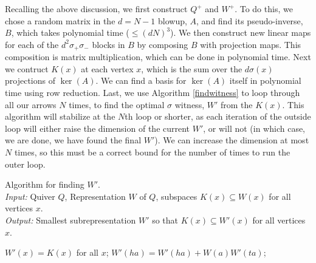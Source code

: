Recalling the above discussion, we first construct $Q^+$ and $W^+$. To do this, we chose a random matrix in the $d=N-1$ blowup, $A$, and find its pseudo-inverse, $B$, which takes polynomial time ($\leq(dN)^3$). We then construct new linear maps for each of the $d^2\sigma_+\sigma_-$ blocks in $B$ by composing $B$ with projection maps. This composition is matrix multiplication, which can be done in polynomial time. Next we contruct $K(x)$ at each vertex $x$, which is the sum over the $d\sigma(x)$ projections of $\ker(A)$. We can find a basis for $\ker(A)$ itself in polynomial time using row reduction. Last, we use Algorithm \ref{findwitness} to loop through all our arrows $N$ times, to find the optimal $\sigma$ witness, $W'$ from the $K(x)$. This algorithm will stabilize at the $N$th loop or shorter, as each iteration of the outside loop will either raise the dimension of the current $W'$, or will not (in which case, we are done, we have found the final $W'$). We can increase the dimension at most $N$ times, so this must be a correct bound for the number of times to run the outer loop. 

\begin{alg}\label{findwitness}
Algorithm for finding $W'$.\\
\emph{Input:} Quiver $Q$, Representation $W$ of $Q$, subspaces $K(x)\subseteq W(x)$ for all vertices $x$.\\
\emph{Output:} Smallest subrepresentation $W'$ so that $K(x)\subseteq W'(x)$ for all vertices $x$.
\begin{algorithmic}[1]
\State $W'(x) = K(x)$ for all $x$;
       \State $W'(ha)= W'(ha)+W(a)W'(ta)$;
    \EndFor
\EndFor
\end{algorithmic}
\end{alg}


